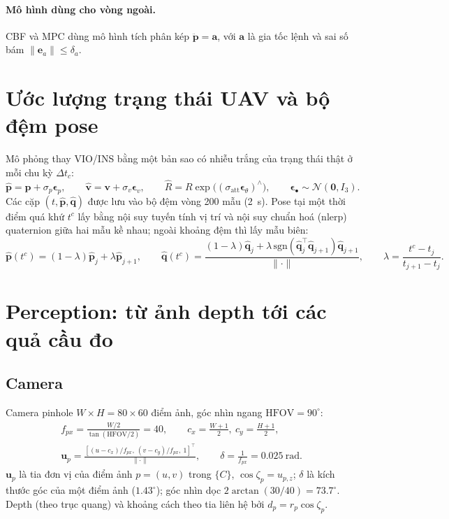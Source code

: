 \documentclass[11pt,a4paper]{article}
\numberwithin{equation}{section}
\newcommand{\vb}[1]{\bm{#1}}
\newcommand{\T}{^{\!\top}}
\theoremstyle{definition}
\theoremstyle{plain}
\theoremstyle{remark}
\begin{document}
\paragraph{Mô hình dùng cho vòng ngoài.} CBF và MPC dùng mô hình tích phân kép $\ddot{\vb p}=\vb a$, với $\vb a$ là gia tốc lệnh và sai số bám $\|\vb e_a\|\le\delta_a$.

\section{Ước lượng trạng thái UAV và bộ đệm pose}
\label{sec:uavest}
Mô phỏng thay VIO/INS bằng một bản sao có nhiễu trắng của trạng thái thật ở mỗi chu kỳ $\Delta t_c$:
\begin{equation}
\hat{\vb p}=\vb p+\sigma_p\bm\epsilon_p,\qquad \hat{\vb v}=\vb v+\sigma_v\bm\epsilon_v,\qquad \hat R=R\exp\!\big((\sigma_{\text{att}}\bm\epsilon_\theta)^\wedge\big),\qquad \bm\epsilon_\bullet\sim\mathcal N(\vb 0,I_3). \label{eq:uavest}
\end{equation}
Các cặp $(t,\hat{\vb p},\hat{\vb q})$ được lưu vào bộ đệm vòng 200 mẫu (2~s). Pose tại một thời điểm quá khứ $t^c$ lấy bằng nội suy tuyến tính vị trí và nội suy chuẩn hoá (nlerp) quaternion giữa hai mẫu kề nhau; ngoài khoảng đệm thì lấy mẫu biên:
\begin{equation}
\hat{\vb p}(t^c)=(1-\lambda)\hat{\vb p}_j+\lambda\hat{\vb p}_{j+1},\qquad
\hat{\vb q}(t^c)=\frac{(1-\lambda)\hat{\vb q}_j+\lambda\,\mathrm{sgn}(\hat{\vb q}_j\T\hat{\vb q}_{j+1})\hat{\vb q}_{j+1}}{\|\cdot\|},\qquad \lambda=\frac{t^c-t_j}{t_{j+1}-t_j}. \label{eq:posebuf}
\end{equation}

\section{Perception: từ ảnh depth tới các quả cầu đo}
\label{sec:perception}

\subsection{Camera}
Camera pinhole $W\times H=80\times60$ điểm ảnh, góc nhìn ngang $\text{HFOV}=90^\circ$:
\begin{gather}
f_{px}=\frac{W/2}{\tan(\text{HFOV}/2)}=40,\qquad c_x=\tfrac{W+1}{2},\ c_y=\tfrac{H+1}{2},\nonumber\\
\vb u_p=\frac{[(u-c_x)/f_{px},\ (v-c_y)/f_{px},\ 1]\T}{\|\cdot\|},\qquad \delta=\frac1{f_{px}}=0.025~\text{rad}. \label{eq:cam}
\end{gather}
$\vb u_p$ là tia đơn vị của điểm ảnh $p=(u,v)$ trong $\{C\}$, $\cos\zeta_p=u_{p,z}$; $\delta$ là kích thước góc của một điểm ảnh ($1.43^\circ$); góc nhìn dọc $2\arctan(30/40)=73.7^\circ$. Depth (theo trục quang) và khoảng cách theo tia liên hệ bởi $d_p=r_p\cos\zeta_p$.
\end{document}
